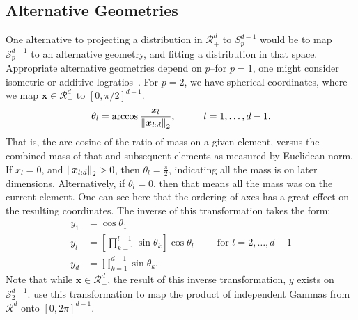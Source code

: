 \subsection{Alternative Geometries}
One alternative to projecting a distribution in $\mathcal{R}_+^d$ to $S_{p}^{d-1}$ would be to map
  $\mathcal{S}_{p}^{d-1}$ to an alternative geometry, and fitting a distribution in that space.
  Appropriate alternative geometries depend on $p$--for $p = 1$, one might consider isometric or
  additive logratios~\citep{aitchison1982}.  For $p = 2$, we have spherical coordinates, where we
  map $\bm{x}\in\mathcal{R}_+^d$ to $[0,\pi/2]^{d-1}$.
  \begin{equation*}
      \theta_l = \arccos\frac{x_l}{\left\lVert \bm{x}_{l:d} \right\rVert_{2}},\hspace{1cm}l = 1,\ldots,d-1.
  \end{equation*}
  That is, the arc-cosine of the ratio of mass on a given element, versus the combined mass of that
  and subsequent elements as measured by Euclidean norm.  If $x_l = 0$, and $\left\lVert \bm{x}_{l:d} \right\rVert_{2} > 0$,
  then $\theta_l = \frac{\pi}{2}$, indicating all the mass is on later dimensions.  Alternatively, if
  $\theta_l = 0$, then that means all the mass was on the current element.  One can see here that the
  ordering of axes has a great effect on the resulting coordinates.  The inverse of this transformation
  takes the form:
  \begin{equation}
    \label{eqn:spherical}
    \begin{aligned}
      y_1 &= \cos\theta_1\\
      y_l &= \left[{\textstyle\prod}_{k = 1}^{l-1}\sin\theta_k\right]\cos\theta_l \hspace{1cm}\text{for } l = 2,\ldots,d-1\\
      y_d &= {\textstyle\prod}_{k = 1}^{d-1}\sin\theta_k.
    \end{aligned}
  \end{equation}
  Note that while $\bm{x}\in \mathcal{R}_+^d$, the result of this inverse transformation,
  $y$ exists on $\mathcal{S}_2^{d-1}$. \cite{nunez2019} use this transformation to map the product
  of independent Gammas from $\mathcal{R}^d$ onto $[0,2\pi]^{d-1}$.

